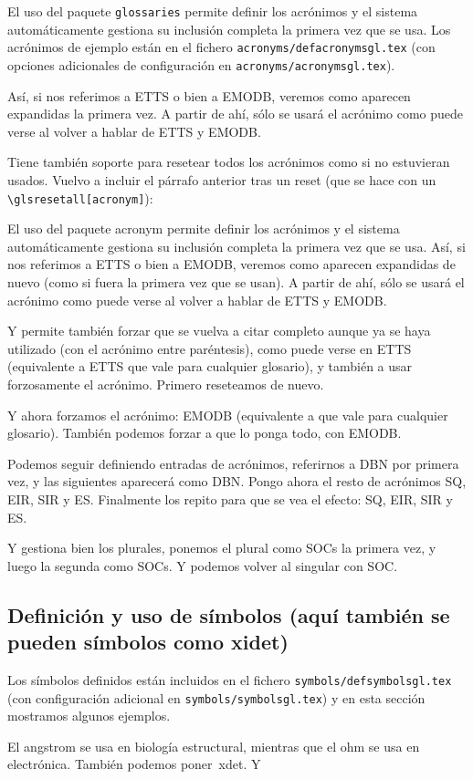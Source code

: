 El uso del paquete \texttt{glossaries} permite definir los acrónimos y
el sistema automáticamente gestiona su inclusión completa la primera vez
que se usa. Los acrónimos de ejemplo están en el fichero
\texttt{acronyms/defacronymsgl.tex} (con opciones adicionales de
configuración en \texttt{acronyms/acronymsgl.tex}).

Así, si nos referimos a \ac{ETTS} o bien a \ac{EMODB},
veremos como aparecen expandidas la primera vez. A partir de ahí, sólo
se usará el acrónimo como puede verse al volver a hablar de \ac{ETTS} y
\ac{EMODB}.

Tiene también soporte para resetear todos los acrónimos como si no
estuvieran usados. Vuelvo a incluir el párrafo anterior tras un reset
(que se hace con un \texttt{\textbackslash{}glsresetall[acronym]}):

\glsresetall[acronym]

El uso del paquete acronym permite definir los acrónimos y el sistema
automáticamente gestiona su inclusión completa la primera vez que se
usa. Así, si nos referimos a \ac{ETTS} o bien a \ac{EMODB}, veremos como
aparecen expandidas de nuevo (como si fuera la primera vez que se
usan). A partir de ahí, sólo se usará el acrónimo como puede verse al
volver a hablar de \ac{ETTS} y \ac{EMODB}.

Y permite también forzar que se vuelva a citar completo aunque ya se
haya utilizado (con el acrónimo entre paréntesis), como puede verse en
\acl{ETTS} (equivalente a \glsdesc{ETTS} que vale para cualquier
glosario), y también a usar forzosamente el acrónimo. Primero reseteamos
de nuevo.

\glsresetall[acronym]

Y ahora forzamos el acrónimo: \acs{EMODB} (equivalente a
 que vale para cualquier glosario). También podemos
forzar a que lo ponga todo, con \acf{EMODB}.


Podemos seguir definiendo entradas de acrónimos, referirnos a \ac{DBN}
por primera vez, y las siguientes aparecerá como \ac{DBN}.  Pongo ahora
el resto de acrónimos \ac{SQ}, \ac{EIR}, \ac{SIR} y
\ac{ES}. Finalmente los repito para que se vea el efecto: \ac{SQ},
\ac{EIR}, \ac{SIR} y \ac{ES}.

Y gestiona bien los plurales, ponemos el plural como \acp{SOC} la
primera vez, y luego la segunda como \acp{SOC}. Y podemos volver al
singular con \ac{SOC}.


\subsection{Definición y uso de símbolos (aquí también
    se pueden símbolos como \ac{xidet})}
\label{sec:simbolos}

Los símbolos definidos están incluidos en el fichero
\texttt{symbols/defsymbolsgl.tex} (con configuración adicional en
\texttt{symbols/symbolsgl.tex}) y en esta sección mostramos algunos
ejemplos.

El \ac{angstrom} se usa en biología estructural, mientras que el
\ac{ohm} se usa en electrónica. También podemos poner~\ac{xdet}. Y
